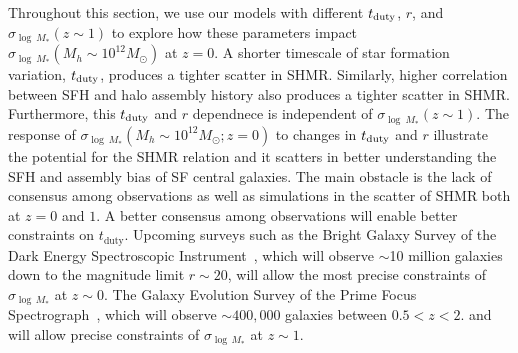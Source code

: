 \documentclass[12pt, letterpaper, preprint, tighten]{aastex62}
\newcommand{\edt}[1]{{\color{dred}{\bf} #1}}
\newcommand{\tduty}{t_{\rm duty}}
\newcommand{\logsfr}{\log\mathrm{SFR}}
\begin{document}
\edt{
    Throughout this section, we use our models with different $\tduty$, $r$, and 
$\sigma_{\log~M_*}(z\sim1)$ to explore how these parameters impact 
$\sigma_{\log~M_*}(M_h\sim10^{12}M_\odot)$ at $z=0$. A shorter timescale of 
star formation variation, $\tduty$, produces a tighter scatter in SHMR. Similarly, 
higher correlation between SFH and halo assembly history also produces a tighter
scatter in SHMR. Furthermore, this $\tduty$ and $r$ dependnece is independent of 
$\sigma_{\log~M_*}(z\sim1)$. The response of $\sigma_{\log~M_*}(M_h\sim10^{12}M_\odot; z=0)$
to changes in $\tduty$ and $r$ illustrate the potential for the SHMR relation 
and it scatters in better understanding the SFH and assembly bias of SF central 
galaxies. The main obstacle is the lack of consensus among observations as well 
as simulations in the scatter of SHMR both at $z=0$ and $1$. 
A better consensus among observations will enable better constraints 
on $t_\mathrm{duty}$. Upcoming surveys such as the Bright Galaxy Survey of the Dark 
Energy Spectroscopic Instrument~\citep[DESI;][]{desicollaboration2016}, which will 
observe $\sim$10 million galaxies down to the magnitude limit $r \sim 20$, will 
allow the most precise constraints of $\sigma_{\log\,M_*}$ at $z\sim0$. The Galaxy 
Evolution Survey of the Prime Focus Spectrograph~\citep[PFS;][]{tamura2016}, which 
will observe $\sim400,000$ galaxies between $0.5 < z < 2.$ and will allow 
precise constraints of $\sigma_{\log\,M_*}$ at $z\sim1$.
}
\end{document}
